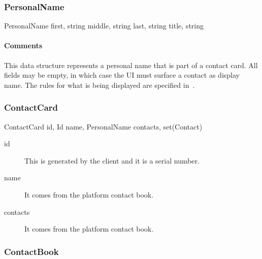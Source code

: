 \documentclass[a4paper,10pt]{article}
\begin{document}
\subsubsection{PersonalName}

\begin{verbbox}
PersonalName
{
  first, string
  middle, string
  last, string
  title, string
}
\end{verbbox}
\begin{center}
\theverbbox
\end{center}

\begin{inparaitem}[ ]
 \item \infrastructure
\end{inparaitem}

\paragraph*{Comments}
This data structure represents a personal name that is part of a contact card. All fields may be empty, in which case the UI must surface a contact as display name. The rules 
for what is being displayed are specified in~\cite{flow_spec}.

\subsubsection{ContactCard}

\begin{verbbox}
ContactCard
{
  id, Id
  name, PersonalName
  contacts, set(Contact)
}
\end{verbbox}
\begin{center}
\theverbbox
\end{center}

\begin{inparaitem}[ ]
 \item \infrastructure
\end{inparaitem}

\SpecialItem
\begin{description}
 \item[id] This is generated by the client and it is a serial number.
 \item[name] It comes from the platform contact book.
 \item[contacts] It comes from the platform contact book.
\end{description}

\subsubsection{ContactBook}
\end{document}
